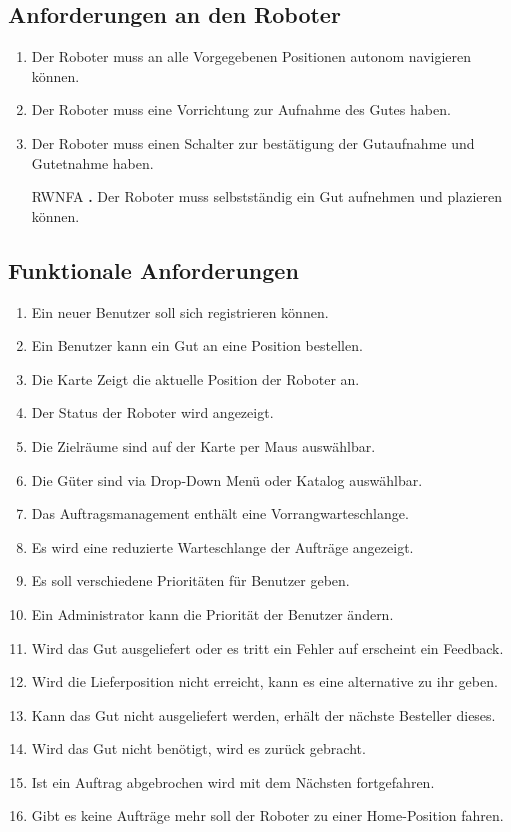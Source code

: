 \subsection{Anforderungen an den Roboter}
\begin{enumerate}[nosep,style=sameline]
\renewcommand{\labelenumi}{RNFA \textbf{\theenumi.}}
\item Der Roboter muss an alle Vorgegebenen Positionen autonom navigieren können.
\item Der Roboter muss eine Vorrichtung zur Aufnahme des Gutes haben.
\item Der Roboter muss einen Schalter zur bestätigung der Gutaufnahme und Gutetnahme haben.
\item[RWNFA \textbf{\theenumi.}] Der Roboter muss selbstständig ein Gut aufnehmen und plazieren können.
\end{enumerate}

\subsection{Funktionale Anforderungen}
\begin{enumerate}[nosep,style=sameline]
\renewcommand{\labelenumi}{LFA \textbf{\theenumi.}}
\item Ein neuer Benutzer soll sich registrieren können.
\item Ein Benutzer kann ein Gut an eine Position bestellen.
\item Die Karte Zeigt die aktuelle Position der Roboter an.
\item Der Status der Roboter wird angezeigt.
\item Die Zielräume sind auf der Karte per Maus auswählbar.
\item Die Güter sind via Drop-Down Menü oder  Katalog auswählbar.
\item Das Auftragsmanagement enthält eine Vorrangwarteschlange. 
\item Es wird eine reduzierte Warteschlange der Aufträge angezeigt.
\item Es soll verschiedene Prioritäten für Benutzer geben.
\item Ein Administrator kann die Priorität der Benutzer ändern.
\item Wird das Gut ausgeliefert oder es tritt ein Fehler auf erscheint ein Feedback.
\item Wird die Lieferposition nicht erreicht, kann es eine alternative zu ihr geben.
\item Kann das Gut nicht ausgeliefert werden, erhält der nächste Besteller dieses.
\item Wird das Gut nicht benötigt, wird es zurück gebracht.
\item Ist ein Auftrag abgebrochen wird mit dem Nächsten fortgefahren.
\item Gibt es keine Aufträge mehr soll der Roboter zu einer Home-Position fahren.
\end{enumerate}
